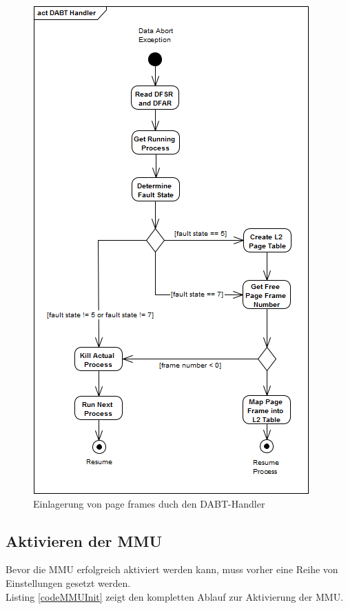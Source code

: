 \begin{figure}[H]
	\centering
	\includegraphics[scale=0.75]{chapters/mmu/figures/DABTHandler}
	\caption{Einlagerung von page frames duch den DABT-Handler}
	\label{fig:dabthandler}
\end{figure}


\subsection{Aktivieren der MMU}
\label{subsect:activateMMU}

Bevor die MMU erfolgreich aktiviert werden kann, muss vorher eine Reihe von Einstellungen gesetzt werden.\\


Listing \ref{codeMMUInit} zeigt den kompletten Ablauf zur Aktivierung der MMU.




